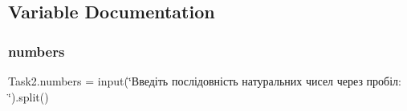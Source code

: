 \subsection{Variable Documentation}
\mbox{\label{namespace_task2_ae10806108edef00a9dbbd46e55d38545}} 
\subsubsection{\texorpdfstring{numbers}{numbers}}
{\footnotesize\ttfamily Task2.\+numbers = input(\char`\"{}Введіть послідовність натуральних чисел через пробіл\+: \char`\"{}).split()}

